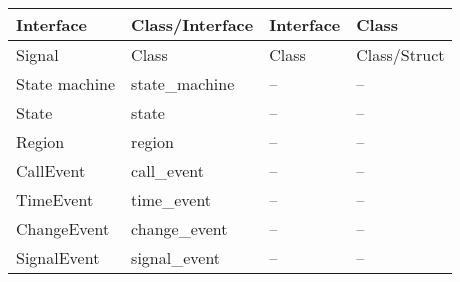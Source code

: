 \begin{table}[]
\begin{tabular}{llll}
		Interface                                                  & Class/Interface                                                    & Interface                                                                  & Class                                                          \\ \hline
		Signal                                                     & Class                                                              & Class                                                                      & Class/Struct                                                   \\ \hline
		State machine                                              & state\_machine                                                     & --                                                                         & --                                                             \\ \hline
		State                                                      & state                                                              & --                                                                         & --                                                             \\ \hline
		Region                                                     & region                                                             & --                                                                         & --                                                             \\ \hline
		CallEvent                                                  & call\_event                                                        & --                                                                         & --                                                             \\ \hline
		TimeEvent                                                  & time\_event                                                        & --                                                                         & --                                                             \\ \hline
		ChangeEvent                                                & change\_event                                                      & --                                                                         & --                                                             \\ \hline
		SignalEvent                                                & signal\_event                                                      & --                                                                         & --                                                             \\ \hline

\end{tabular}
\end{table}
